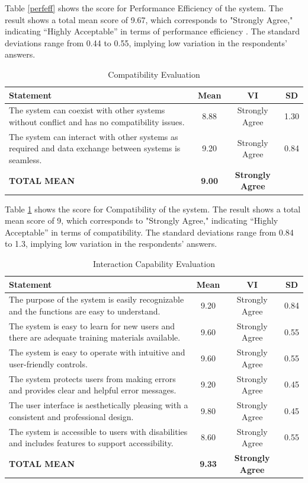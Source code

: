 Table \ref{perfeff} shows the score for Performance Efficiency of the system. The result shows a total mean score of 9.67, which corresponds to "Strongly Agree," indicating “Highly Acceptable” in terms of performance efficiency . The standard deviations range from 0.44 to 0.55, implying low variation in the respondents’ answers.

\begin{table}[ht]
	\centering
	\caption{Compatibility Evaluation}
	\label{comptbl}
	\renewcommand{\arraystretch}{1.2}
	\begin{tabularx}{\linewidth}{|X|c|c|c|}
		\hline
		\textbf{Statement} & \textbf{Mean} & \textbf{VI} & \textbf{SD} \\ \hline
		The system can coexist with other systems without conflict and has no compatibility issues.
		& 8.88 & Strongly Agree & 1.30 \\ \hline
		The system can interact with other systems as required and data exchange between systems is seamless.
		& 9.20 & Strongly Agree & 0.84 \\ \hline
		\textbf{TOTAL MEAN} & \textbf{9.00} & \textbf{Strongly Agree} & \\ \hline
	\end{tabularx}
\end{table}

Table \ref{comptbl} shows the score for Compatibility of the system. The result shows a total mean score of 9, which corresponds to "Strongly Agree," indicating “Highly Acceptable” in terms of compatibility. The standard deviations range from 0.84 to 1.3, implying low variation in the respondents’ answers.


\begin{table}[ht]
	\centering
	\caption{Interaction Capability Evaluation}
	\label{intcap}
	\renewcommand{\arraystretch}{1.2}
	\begin{tabularx}{\linewidth}{|X|c|c|c|}
		\hline
		\textbf{Statement} & \textbf{Mean} & \textbf{VI} & \textbf{SD} \\ \hline
		The purpose of the system is easily recognizable and the functions are easy to understand.
		& 9.20 & Strongly Agree & 0.84 \\ \hline
		The system is easy to learn for new users and there are adequate training materials available.
		& 9.60 & Strongly Agree & 0.55 \\ \hline
		The system is easy to operate with intuitive and user-friendly controls.
		& 9.60 & Strongly Agree & 0.55 \\ \hline
		The system protects users from making errors and provides clear and helpful error messages.
		& 9.20 & Strongly Agree & 0.45 \\ \hline
		The user interface is aesthetically pleasing with a consistent and professional design.
		& 9.80 & Strongly Agree & 0.45 \\ \hline
		The system is accessible to users with disabilities and includes features to support accessibility.
		& 8.60 & Strongly Agree & 0.55 \\ \hline
		\textbf{TOTAL MEAN} & \textbf{9.33} & \textbf{Strongly Agree} & \\ \hline
	\end{tabularx}
\end{table}

